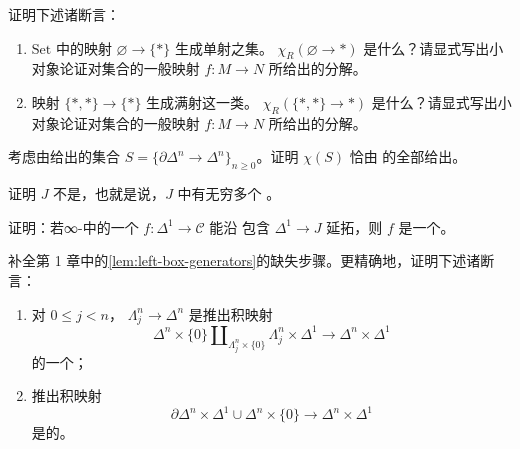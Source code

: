 \begin{exercise}\label{ex:generating-maps-set}
证明下述诸断言：
\begin{enumerate}[label=(\arabic*)]
  \item $\mathrm{Set}$ 中的映射 $\varnothing \to \{\ast\}$ 生成单射之集。
        $\chi_R(\varnothing \to \ast)$ 是什么？请显式写出小对象论证对集合的一般映射
        $f\colon M \to N$ 所给出的分解。
  \item 映射 $\{\ast, \ast\} \to \{\ast\}$ 生成满射这一类。
        $\chi_R(\{\ast, \ast\} \to \ast)$ 是什么？请显式写出小对象论证对集合的一般映射
        $f\colon M \to N$ 所给出的分解。
\end{enumerate}
\end{exercise}

\begin{exercise}\label{ex:chi-boundary-inclusions}
考虑由\trBoundaryInclusion{}给出的集合
$S = \{\partial\Delta^n \to \Delta^n\}_{n \ge 0}$。证明 $\chi(S)$ 恰由\trSimplicialSet{}%
的全部\trMonomorphism{}给出。
\end{exercise}

\begin{exercise}\label{ex:J-not-compact}
证明 $J$ 不是\trCompact{}\trSimplicialSet{}，也就是说，$J$ 中有无穷多个%
\trNonDegenerate{}%
\trSimplex{}。
\end{exercise}

\begin{exercise}\label{ex:extension-over-J-equivalence}
证明：若∞-\trCategory{}中的一个\trMorphism{} $f\colon \Delta^1 \to \mathcal{C}$ 能沿
包含 $\Delta^1 \to J$ 延拓，则 $f$ 是一个\trEquivalence{}。
\end{exercise}

\begin{exercise}\label{ex:horn-retract-pushout-product}
补全第 1 章中的\cref{lem:left-box-generators}的缺失步骤。更精确地，证明下述诸断言：
\begin{enumerate}[label=(\arabic*)]
  \item 对 $0 \le j < n$，\trHornInclusion{} $\Lambda^n_j \to \Delta^n$ 是推出积映射
        \[
        \Delta^n \times \{0\} \amalg_{\Lambda^n_j \times \{0\}} \Lambda^n_j \times \Delta^1
        \to \Delta^n \times \Delta^1
        \]
        的一个\trRetract{}；
  \item 推出积映射
        \[
        \partial\Delta^n \times \Delta^1 \cup \Delta^n \times \{0\}
        \to \Delta^n \times \Delta^1
        \]
        是\trLeftAnodyne{}的。
\end{enumerate}
\end{exercise}

